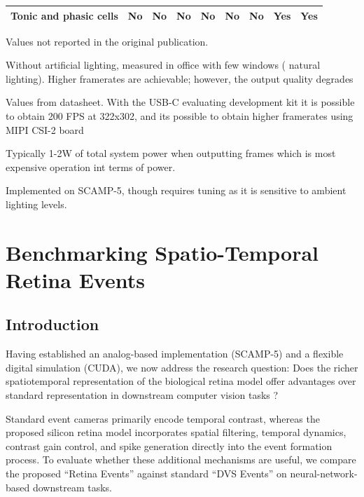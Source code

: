 \documentclass{article}
\begin{document}
\begin{table}[!t]
{\begin{threeparttable}
\begin{tabular}{lcccccccc}
Tonic and phasic cells & No & No & No & No & No & No & Yes & Yes \\ \bottomrule
\end{tabular}
\begin{tablenotes}
\small
\item[a] Values not reported in the original publication.
\item[b] Without artificial lighting, measured in office with few windows ( natural lighting). Higher framerates are achievable; however, the output quality degrades
\item[c] Values from datasheet. With the USB-C evaluating development kit it is possible to obtain 200 FPS at 322x302, and its possible to obtain higher framerates using MIPI CSI-2 board
\item[d] Typically 1-2W of total system power when outputting frames which is most expensive operation int terms of power. 
\item[e] Implemented on SCAMP-5, though requires tuning as it is sensitive to ambient lighting levels.
\end{tablenotes}
\end{threeparttable}
}
\label{tablecompare}
\end{table}

\section{Benchmarking Spatio-Temporal Retina Events}
\label{sec:retina_benefits}

\subsection{Introduction}
Having established an analog-based implementation (SCAMP-5) and a flexible digital simulation (CUDA), we now address the research question: Does the richer spatiotemporal representation of the biological retina model offer advantages over standard representation in downstream computer vision tasks ? 

Standard event cameras primarily encode temporal contrast, whereas the proposed silicon retina model incorporates spatial filtering, temporal dynamics, contrast gain control, and spike generation directly into the event formation process. To evaluate whether these additional mechanisms are useful, we compare the proposed ``Retina Events'' against standard ``DVS Events'' on neural-network-based downstream tasks.
\end{document}
